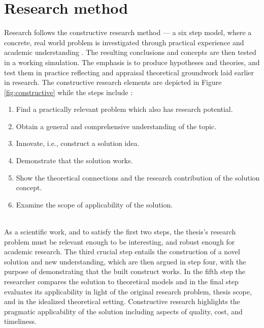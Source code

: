 \documentclass[12pt,a4paper,oneside,pdftex]{report}
\begin{document}

\section{Research method}
Research follows the constructive research method --- a six step model, where a concrete, real world problem is investigated through practical experience and academic understanding \citep{kasanen1993constructive}. The resulting conclusions and concepts are then tested in a working simulation. The emphasis is to produce hypotheses and theories, and test them in practice reflecting and appraisal theoretical groundwork laid earlier in research. The constructive research elements are depicted in Figure \ref{fig:constructive} while the steps include \citet{kasanen1993constructive}:
\\
\begin{adjustwidth}{2.5em}{0pt}
\small
\begin{enumerate}[itemsep=0mm]
\item Find a practically relevant problem which also has research potential.
\item Obtain a general and comprehensive understanding of the topic.
\item Innovate, i.e., construct a solution idea.
\item Demonstrate that the solution works.
\item Show the theoretical connections and the research contribution of the solution concept.
\item Examine the scope of applicability of the solution.
\end{enumerate}
\normal
\end{adjustwidth}

\\[2.00cm]

As a scientific work, and to satisfy the first two steps, the thesis's research problem must be relevant enough to be interesting, and robust enough for academic research. The third crucial step entails the construction of a novel solution and new understanding, which are then argued in step four, with the purpose of demonstrating that the built construct works. In the fifth step the researcher compares the solution to theoretical models and in the final step evaluates its applicability in light of the original research problem, thesis scope, and in the idealized theoretical setting. Constructive research highlights the pragmatic applicability of the solution including aspects of quality, cost, and timeliness.
\end{document}
